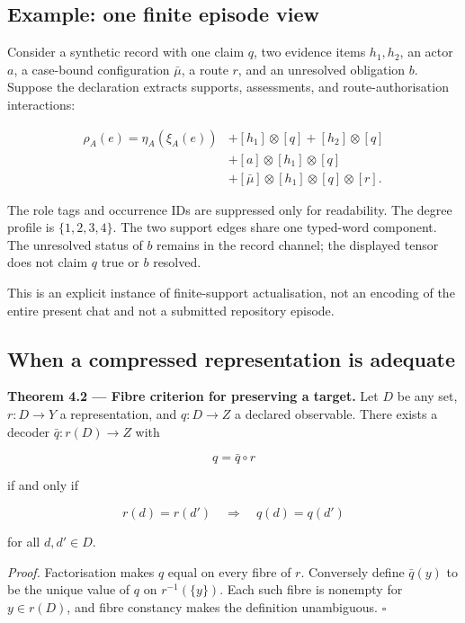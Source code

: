 \documentclass[11pt,a4paper]{article}
\begin{document}
\subsection{Example: one finite episode
view}\label{example-one-finite-episode-view}

Consider a synthetic record with one claim \(q\), two evidence items
\(h_1,h_2\), an actor \(a\), a case-bound configuration \(\bar\mu\), a
route \(r\), and an unresolved obligation \(b\). Suppose the declaration
extracts supports, assessments, and route-authorisation interactions:

\nopagebreak[4]

\[
\begin{aligned}
\rho_A(e)=\eta_A(\xi_A(e))
&+[h_1]\otimes[q]+[h_2]\otimes[q]\\
&+[a]\otimes[h_1]\otimes[q]\\
&+[\bar\mu]\otimes[h_1]\otimes[q]\otimes[r].
\end{aligned}
\]

The role tags and occurrence IDs are suppressed only for readability.
The degree profile is \(\{1,2,3,4\}\). The two support edges share one
typed-word component. The unresolved status of \(b\) remains in the
record channel; the displayed tensor does not claim \(q\) true or \(b\)
resolved.

This is an explicit instance of finite-support actualisation, not an
encoding of the entire present chat and not a submitted repository
episode.

\subsection{When a compressed representation is
adequate}\label{when-a-compressed-representation-is-adequate}


\textbf{Theorem 4.2 --- Fibre criterion for preserving a target.} Let
\(D\) be any set, \(r:D\to Y\) a representation, and \(q:D\to Z\) a
declared observable. There exists a decoder \(\bar q:r(D)\to Z\) with

\nopagebreak[4]

\[q=\bar q\circ r\]

if and only if

\nopagebreak[4]

\[r(d)=r(d')\quad\Longrightarrow\quad q(d)=q(d')\]

for all \(d,d'\in D\).

\emph{Proof.} Factorisation makes \(q\) equal on every fibre of \(r\).
Conversely define \(\bar q(y)\) to be the unique value of \(q\) on
\(r^{-1}(\{y\})\). Each such fibre is nonempty for \(y\in r(D)\), and
fibre constancy makes the definition unambiguous. \(\square\)
\end{document}
